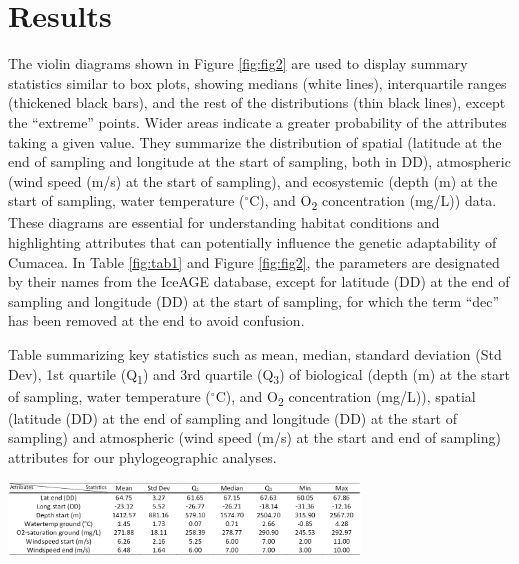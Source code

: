 {\section{Results}\label{results}
The violin diagrams shown in Figure \ref{fig:fig2} are used to display summary statistics similar to box plots, showing medians (white lines), interquartile ranges (thickened black bars), and the rest of the distributions (thin black lines), except the ``extreme'' points. Wider areas indicate a greater probability of the attributes taking a given value. They summarize the distribution of spatial (latitude at the end of sampling and longitude at the start of sampling, both in DD), atmospheric (wind speed (m/s) at the start of sampling), and ecosystemic (depth (m) at the start of sampling, water temperature ($^\circ$C), and O\textsubscript{2} concentration (mg/L)) data. These diagrams are essential for understanding habitat conditions and highlighting attributes that can potentially influence the genetic adaptability of Cumacea. In Table \ref{fig:tab1} and Figure \ref{fig:fig2}, the parameters are designated by their names from the IceAGE database, except for latitude (DD) at the end of sampling and longitude (DD) at the start of sampling, for which the term ``dec'' has been removed at the end to avoid confusion.

\begin{table}[H]
    \centering
    \caption{Table summarizing key statistics such as mean, median, standard deviation (Std Dev), 1st quartile (Q\textsubscript{1}) and 3rd quartile (Q\textsubscript{3}) of biological (depth (m) at the start of sampling, water temperature ($^\circ$C), and O\textsubscript{2} concentration (mg/L)), spatial (latitude (DD) at the end of sampling and longitude (DD) at the start of sampling) and atmospheric (wind speed (m/s) at the start and end of sampling) attributes for our phylogeographic analyses. \label{fig:tab1}}
    \includegraphics[width=0.7\textwidth]{Table_Attributes_Data.png}
\end{table}

}
